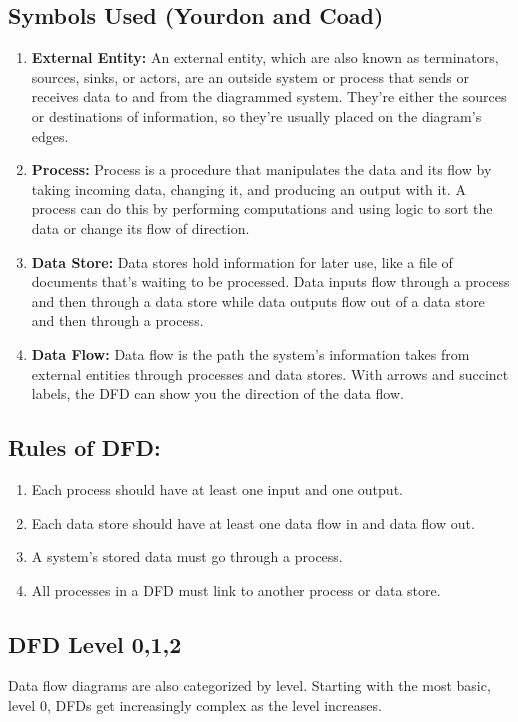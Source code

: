 \documentclass[16pt]{article}
\begin{document}
\subsection{\textbf{Symbols Used (Yourdon and Coad)}}
\begin{enumerate}
    \item \textbf{External Entity:} An external entity, which are also known as terminators, sources, sinks, or actors,
    are an outside system or process that sends or receives data to and from the diagrammed system. They’re
    either the sources or destinations of information, so they’re usually placed on the diagram’s edges.
    \item \textbf{Process:} Process is a procedure that manipulates the data and its flow by taking incoming data,
    changing it, and producing an output with it. A process can do this by performing computations and using
    logic to sort the data or change its flow of direction.
    \item \textbf{Data Store:} Data stores hold information for later use, like a file of documents that’s waiting to be
    processed. Data inputs flow through a process and then through a data store while data outputs flow out of
    a data store and then through a process.
    \item \textbf{Data Flow:} Data flow is the path the system’s information takes from external entities through
    processes and data stores. With arrows and succinct labels, the DFD can show you the direction of the
    data flow.
\end{enumerate}

\subsection{\textbf{Rules of DFD:}}
\begin{enumerate}
    \item Each process should have at least one input and one output.
    \item Each data store should have at least one data flow in and data flow out.
    \item A system’s stored data must go through a process.
    \item All processes in a DFD must link to another process or data store.
\end{enumerate}

\subsection{\textbf{DFD Level 0,1,2}}
Data flow diagrams are also categorized by level. Starting with the most basic, level 0, DFDs get
increasingly complex as the level increases.
\end{document}
